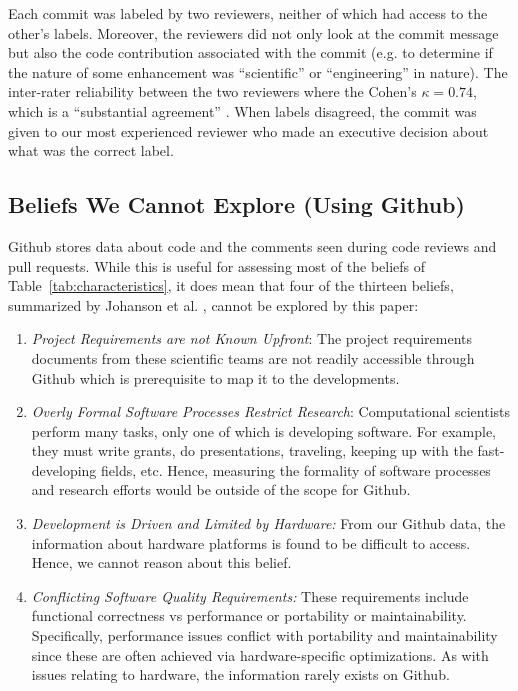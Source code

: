 \documentclass[conference,10pt]{IEEEtran}
\newcommand{\be}{\begin{enumerate}}
\newcommand{\ee}{\end{enumerate}}
\begin{document}
 

Each commit was labeled by two reviewers,
neither of which had access to the other's labels. Moreover, the reviewers did not only look at the commit message but also the code contribution associated with the commit (e.g. to determine if the nature of some enhancement was 
``scientific'' or ``engineering'' in nature). The inter-rater reliability between the two reviewers where the Cohen's $\kappa = 0.74$, which is a ``substantial agreement'' \cite{irr_kappa}. When labels disagreed, the commit was given to our most experienced reviewer who made an executive decision about what
was the correct label. 

\subsection{Beliefs We Cannot Explore (Using Github)}

Github stores data about code and the comments seen during code reviews and pull requests. While this is useful for assessing most of the beliefs of Table~\ref{tab:characteristics}, it does mean that four of the thirteen beliefs, summarized by Johanson et al. \cite{johan18_secs}, cannot be explored by this paper:

\be
\item {\em Project Requirements are not Known Upfront}: The project requirements documents from these scientific teams are not readily accessible through Github which is prerequisite to map it to the developments.   
\item {\em Overly Formal Software Processes Restrict Research}: Computational scientists perform many tasks,
only one of which is developing software. For example,
they must write grants, do presentations, traveling, keeping up with the fast-developing fields, etc. Hence, measuring the formality of software processes and research efforts would be outside of the scope for Github.
\item {\em Development is Driven and Limited by Hardware:}
From our Github data, the information about hardware platforms is found to be difficult to access. Hence, we cannot reason about this belief.
\item {\em Conflicting Software Quality Requirements:} These requirements include functional correctness vs
performance or portability or maintainability. Specifically, performance issues conflict with portability and maintainability since these are often achieved via hardware-specific optimizations. As with issues
relating to hardware,
the information rarely exists on Github. 
\ee
\end{document}
